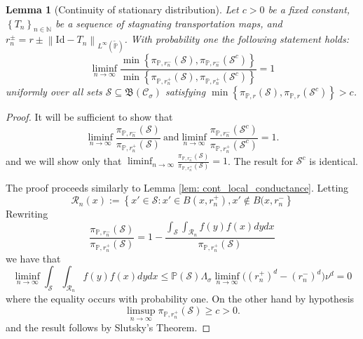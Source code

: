 \documentclass{article}
\newcommand{\norm}[1]{\left\lVert#1\right\rVert}
\newcommand{\set}[1]{\left\{#1\right\}}
\newcommand{\seq}[1]{\set{#1}_{n \in \N}}
\newcommand{\N}{\mathbb{N}}
\newcommand{\Cset}{\mathcal{C}}
\newcommand{\Sset}{\mathcal{S}}
\newcommand{\Csig}{\Cset_{\sigma}}
\newcommand{\Pbb}{\mathbb{P}}
\newcommand{\1}{\mathbf{1}}
\theoremstyle{alden}
\theoremstyle{aldenthm}
\newtheorem{lemma}{Lemma}
\theoremstyle{remark}
\begin{document}
\begin{lemma}[Continuity of stationary distribution]
	\label{lem: cont_stationary_dist}
	Let $c > 0$ be a fixed constant, $\seq{T_n}$ be a sequence of stagnating transportation maps, and $r_n^{\pm} = r \pm \norm{\mathrm{Id} - T_n}_{L^{\infty}(\widetilde{\Pbb})}$.  With probability one the following statement holds:
	\begin{equation*}
	\liminf_{n \to \infty} \frac{\min \set{\pi_{\Pbb,r_n^-}(\Sset), \pi_{\Pbb,r_n^-}(\Sset^c)} }{\min \set{\pi_{\Pbb,r_n^+}(\Sset), \pi_{\Pbb,r_n^+}(\Sset^c)} } = 1
	\end{equation*}
	uniformly over all sets $\Sset \subseteq \mathfrak{B}(\Csig)$ satisfying $\min \set{\pi_{\Pbb,r}(\Sset), \pi_{\Pbb,r}(\Sset^c)}> c$. 
\end{lemma}
\begin{proof}
	It will be sufficient to show that
	\begin{equation*}
	\liminf_{n \to \infty} \frac{\pi_{\Pbb,r_n^-}(\Sset)}{\pi_{\Pbb,r_n^+}(\Sset)} ~ \text{and} \liminf_{n \to \infty} \frac{\pi_{\Pbb,r_n^-}(\Sset^c)}{\pi_{\Pbb,r_n^+}(\Sset^c)} = 1.
	\end{equation*}
	and we will show only that $\liminf_{n \to \infty} \frac{\pi_{\Pbb,r_n^-}(\Sset)}{\pi_{\Pbb,r_n^+}(\Sset)} = 1$. The result for $\Sset^c$ is identical. 
	
	The proof proceeds similarly to Lemma \ref{lem: cont_local_conductance}. Letting 
	\begin{equation*}
	\mathcal{R}_n(x) := \set{x' \in \Sset: x' \in B(x,r_n^+), x' \not\in B(x,r_n^-}
	\end{equation*}
	Rewriting
	\begin{equation*}
	 \frac{\pi_{\Pbb,r_n^-}(\Sset)}{\pi_{\Pbb,r_n^+}(\Sset)} = 1 - \frac{\int_{\Sset} \int_{\mathcal{R}_n} f(y) f(x) dy dx}{\pi_{\Pbb,r_n^+}(\Sset)}
	\end{equation*}
	we have that
	\begin{equation*}
	\liminf_{n \to \infty} \int_{\Sset} \int_{\mathcal{R}_n} f(y) f(x) dy dx \leq \Pbb(\Sset) \Lambda_{\sigma} \liminf_{n \to \infty}\bigl( (r_n^+)^d - (r_n^-)^d\bigr) \nu^d = 0
	\end{equation*}
	where the equality occurs with probability one. On the other hand by hypothesis
	\begin{equation*}
	\limsup_{n \to \infty} \pi_{\Pbb,r_n^+}(\Sset) \geq c > 0.
	\end{equation*}
	and the result follows by Slutsky's Theorem. 
\end{proof}
\end{document}
